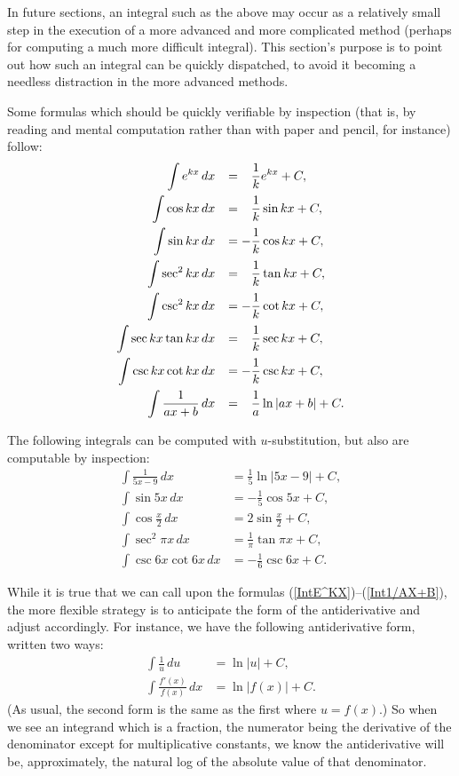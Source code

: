 In future sections, an integral such as the above may occur as a
relatively small step in the execution of a more advanced and
more complicated method
(perhaps for computing a much more difficult integral).  
This section's purpose is to point out how such an integral can be 
quickly dispatched, to avoid it becoming a needless distraction
in the more advanced methods.

Some formulas which should be quickly verifiable by inspection
(that is, by reading and mental computation rather than 
with paper and pencil, for instance) follow:
\begin{align}
\int e^{kx}\,dx&\hphantom{-}=\hphantom{-}\frac1ke^{kx}+C,\label{IntE^KX}\\
\int \cos kx\,dx&\hphantom{-}=\hphantom{-}\frac1k \sin kx+C,\\
\int\sin kx\,dx&\hphantom{-}=-\frac1k\cos kx+C,\\
\int \sec^2kx\,dx&\hphantom{-}=\hphantom{-}\frac1k\tan kx+C,\\
\int\csc^2kx\,dx&\hphantom{-}=-\frac1k\cot kx+C,\\
\int\sec kx\tan kx\,dx&\hphantom{-}=\hphantom{-}\frac1k\sec kx+C,\\
\int\csc kx\cot kx\,dx&\hphantom{-}=-\frac1k\csc kx+C,\\
\int\frac1{ax+b}\,dx&\hphantom{-}=\hphantom{-}\frac1a\ln|ax+b|+C.
            \label{Int1/AX+B}
\end{align}

\bex The following integrals can be computed with $u$-substitution,
but also are computable by inspection:
\begin{align*}
\int\frac1{5x-9}\,dx&=\frac15\ln|5x-9|+C,\\
\int\sin5x\,dx&=-\frac15\cos5x+C,\\
\int\cos\frac{x}2\,dx&=2\sin\frac{x}2+C,\\
\int\sec^2\pi x\,dx&=\frac1{\pi}\tan\pi x+C,\\
\int\csc6x\cot6x\,dx&=-\frac16\csc6x+C.\end{align*}
\eex

While it is true that we can call upon the formulas
(\ref{IntE^KX})--(\ref{Int1/AX+B}), the more flexible
strategy is to anticipate the form of the antiderivative
and adjust accordingly.  For instance, we have the following
antiderivative form, written two ways:
\begin{align*}
\int \frac{1}u\,du&=\ln|u|+C,\\
\int\frac{f'(x)}{f(x)}\,dx&=\ln|f(x)|+C.\end{align*}
(As usual, the second form is the same as the first where 
$u=f(x)$.) So when we see an integrand which is a fraction,
the numerator being the derivative of the denominator
except for multiplicative constants, we know the 
antiderivative will be, approximately, the natural 
log of the absolute value of that denominator.

